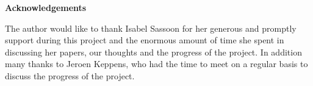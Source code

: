 \mbox{}\newline\vspace{10mm} \mbox{}\LARGE
%
{\bf Acknowledgements} \normalsize \vspace{5mm}

The author would like to thank Isabel Sassoon for her generous and promptly support during this project and the enormous amount of time she spent in discussing her papers, our thoughts and the progress of the project. In addition many thanks to Jeroen Keppens, who had the time to meet on a regular basis to discuss the progress of the project.